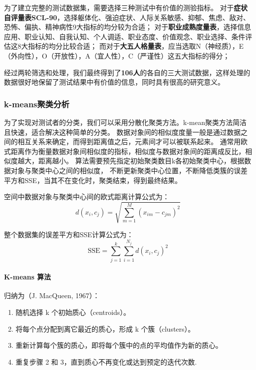 \documentclass[withoutpreface,bwprint]{cumcmthesis} %
\begin{document}
为了建立完整的测试数据集，需要选择三种测试中有价值的测验指标。
对于\textbf{症状自评量表SCL-90}，选择躯体化、强迫症状、人际关系敏感、抑郁、焦虑、敌对、恐怖、偏执、精神病性9大指标的均分较为合适；
对于\textbf{职业成熟度量表}，选择信息应用、职业认知、自我认知、个人调适、职业态度、价值观念、职业选择、条件评估这8大指标的均分比较合适；
而对于\textbf{大五人格量表}，应当选取N（神经质），E（外向性），O（开放性），A（宜人性），C（严谨性）这五大指标的得分；

经过两轮筛选和处理，我们最终得到了\textbf{106人}的各自的三大测试数据，这样处理的数据很好地保留了测试结果中有价值的信息，同时具有很高的研究意义。


\subsubsection{k-means聚类分析}

为了实现对测试者的分类，我们可以采用分散化聚类方法。k-mean聚类方法简洁且快速，适合解决这种简单的分类。
数据对象间的相似度度量一般是通过数据之间的相互关系来确定，而得到距离值之后，元素间才可以被联系起来。
通常用欧式距离作为衡量数据对象间相似度的指标，相似度与数据对象间的距离成反比，相似度越大，距离越小。
算法需要预先指定初始聚类数目k各初始聚类中心，根据数据对象与聚类中心之间的相似度，
不断更新聚类中心位置，不断降低类簇的误差平方和SSE，当其不在变化时，聚类结束，得到最终结果。


空间中数据对象与聚类中心间的欧式距离计算公式为：
\begin{equation}
    d(x_i, c_j) = \sqrt{\sum_{m=1}^M (x_{im} - c_{jm})^2}
    \label{eq:distance}
\end{equation}

整个数据集的误差平方和SSE计算公式为：
\begin{equation}
    \text{SSE} = \sum_{j=1}^k \sum_{i=1}^{N_j} d(x_i, c_j)^2
    \label{eq:SSE}
\end{equation}
    

\paragraph*{K-means 算法}归纳为（J. MacQueen, 1967）\cite{k-means}：
\begin{enumerate}
    \item 随机选择 k 个初始质心（centroids）。
    
    \item 将每个点分配到离它最近的质心，形成 k 个簇（clusters）。
    
    \item 重新计算每个簇的质心，即将每个簇中的点的平均值作为新的质心。
    
    \item 重复步骤 2 和 3，直到质心不再变化或达到预定的迭代次数.

\end{enumerate}
\end{document}
